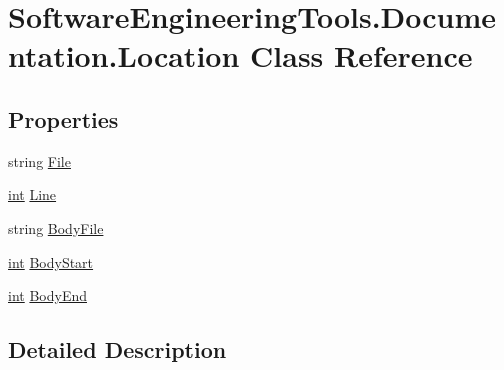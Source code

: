 \hypertarget{class_software_engineering_tools_1_1_documentation_1_1_location}{\section{Software\+Engineering\+Tools.\+Documentation.\+Location Class Reference}
\label{class_software_engineering_tools_1_1_documentation_1_1_location}
}
\subsection*{Properties}
\begin{DoxyCompactItemize}
\item 
string \hyperlink{class_software_engineering_tools_1_1_documentation_1_1_location_a98e8fc3bd0ae61be01ab5071b92f6e3c}{File}
\item 
\hyperlink{namespace_software_engineering_tools_1_1_documentation_a4a8017aa254d1d05b03db5132b7dd3a7afa7153f7ed1cb6c0fcf2ffb2fac21748}{int} \hyperlink{class_software_engineering_tools_1_1_documentation_1_1_location_af7d5f6bd7cf1a468b61bd6e80e73ac01}{Line}
\item 
string \hyperlink{class_software_engineering_tools_1_1_documentation_1_1_location_a223e6ae79f810e6eebe94ecb9eb554ee}{Body\+File}
\item 
\hyperlink{namespace_software_engineering_tools_1_1_documentation_a4a8017aa254d1d05b03db5132b7dd3a7afa7153f7ed1cb6c0fcf2ffb2fac21748}{int} \hyperlink{class_software_engineering_tools_1_1_documentation_1_1_location_aa4f3164d2444ad20dbc297e3aebaf4d8}{Body\+Start}
\item 
\hyperlink{namespace_software_engineering_tools_1_1_documentation_a4a8017aa254d1d05b03db5132b7dd3a7afa7153f7ed1cb6c0fcf2ffb2fac21748}{int} \hyperlink{class_software_engineering_tools_1_1_documentation_1_1_location_acc88f52f5a3c4baff9c28b50f93af935}{Body\+End}
\end{DoxyCompactItemize}


\subsection{Detailed Description}


